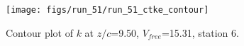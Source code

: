 \begin{figure}[H]
\centering
\texttt{[image: figs/run\_51/run\_51\_ctke\_contour]}
\caption{Contour plot of $k$ at $z/c$=9.50, $V_{free}$=15.31, station 6.}
\end{figure}


